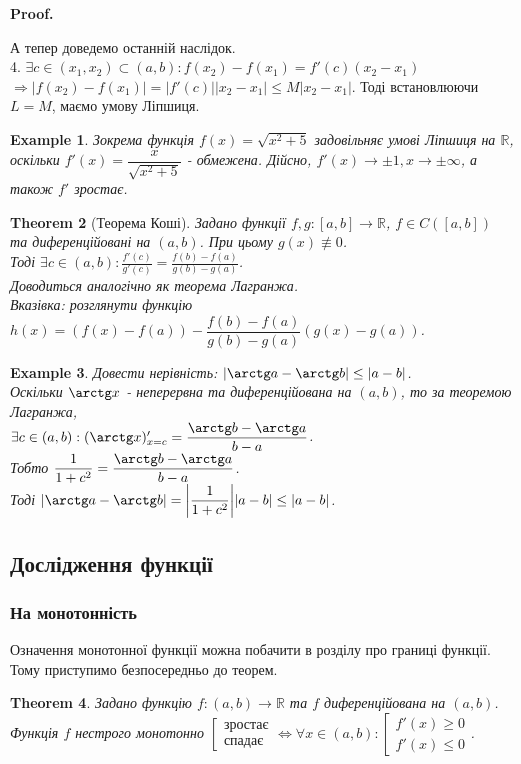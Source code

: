 \documentclass[a4paper, 14pt]{article}
\makeatletter
\def\qed{$\blacksquare$}
\theoremstyle{theoremdd}
\newtheorem{theorem}{Theorem}[subsection]
\theoremstyle{theoremdd}
\theoremstyle{theoremdd}
\theoremstyle{theoremdd}
\newtheorem{example}[theorem]{Example}
\theoremstyle{theoremdd}
\theoremstyle{theoremdd}
\theoremstyle{theoremdd}
\theoremstyle{theoremdd}
\renewenvironment{proof}[1][Proof.\\]{\par
\pushQED{\hfill \qed}%
\normalfont \topsep6\p@\@plus6\p@\relax
\trivlist
\item\relax
{\bfseries
#1\@addpunct{.}}\hspace\labelsep\ignorespaces
}{%
\popQED\endtrivlist\@endpefalse
}
\makeatother
\begin{document}
\begin{proof}
А тепер доведемо останній наслідок.\\
4. $\exists c \in (x_1,x_2) \subset (a,b): f(x_2)-f(x_1)=f'(c)(x_2-x_1)$\\
$\Rightarrow |f(x_2)-f(x_1)|=|f'(c)||x_2-x_1| \leq M|x_2-x_1|$. Тоді встановлюючи $L=M$, маємо умову Ліпшиця.
\end{proof}

\begin{example}
Зокрема функція $f(x) =\sqrt{x^2+5}$ задовільняє умові Ліпшиця на $\mathbb{R}$, оскільки $f'(x) = \dfrac{x}{\sqrt{x^2+5}}$ - обмежена. Дійсно, $f'(x) \to \pm 1, x \to \pm \infty$, а також $f'$ зростає.
\end{example}

\begin{theorem}[Теорема Коші]
Задано функції $f,g: [a,b] \to \mathbb{R}$, $f \in C([a,b])$ та диференційовані на $(a,b)$. При цьому $g(x) \not\equiv 0$.\\
Тоді $\exists c \in (a,b): \displaystyle \frac{f'(c)}{g'(c)}  =  \frac{f(b)-f(a)}{g(b)-g(a)}$.\\
\textit{Доводиться аналогічно як теорема Лагранжа.}\\
\textit{Вказівка: розглянути функцію $h(x) = (f(x) - f(a)) - \dfrac{f(b)-f(a)}{g(b)-g(a)}(g(x)-g(a))$.}
\end{theorem}

\begin{example}
Довести нерівність: $|\arctg a - \arctg b| \leq |a-b|$.\\
Оскільки $\arctg x$ - неперервна та диференційована на $(a,b)$, то за теоремою Лагранжа,\\
$\exists c \in (a,b): (\arctg x)'_{x = c} = \dfrac{\arctg b - \arctg a}{b-a}$.\\
Тобто $\dfrac{1}{1+c^2} =\dfrac{\arctg b - \arctg a}{b-a}$.\\
Тоді $|\arctg a - \arctg b| = \abs{\dfrac{1}{1+c^2}} |a-b| \leq |a-b|$.
\end{example}

\subsection{Дослідження функції}
\subsubsection{На монотонність}
Означення монотонної функції можна побачити в розділу про границі функції. Тому приступимо безпосередньо до теорем.
\begin{theorem}
Задано функцію $f: (a,b) \to \mathbb{R}$ та $f$ диференційована на $(a,b)$.\\
Функція $f$ нестрого монотонно $\left[ \begin{gathered} \textrm{зростає} \\ \textrm{спадає} \end{gathered} \right. \iff \forall x \in (a,b): \left[ \begin{gathered} f'(x) \geq 0 \\ f'(x) \leq 0 \end{gathered} \right.$.
\end{theorem}
\end{document}
